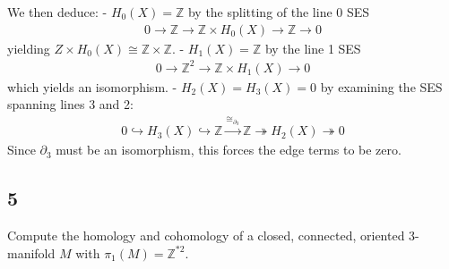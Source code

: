 \begin{solution}
We then deduce: - \(H_0(X) = {\mathbb{Z}}\) by the splitting of the line
0 SES
\begin{align*}
  0 \to {\mathbb{Z}}\to {\mathbb{Z}}\times H_0(X) \to {\mathbb{Z}}\to 0
  \end{align*}
yielding \(Z\times H_0(X) \cong {\mathbb{Z}}\times {\mathbb{Z}}\). -
\(H_1(X) = {\mathbb{Z}}\) by the line 1 SES
\begin{align*}
  0 \to {\mathbb{Z}}^2 \to {\mathbb{Z}}\times H_1(X) \to 0
  \end{align*}
which yields an isomorphism. - \(H_2(X) = H_3(X) = 0\) by examining the
SES spanning lines 3 and 2:
\begin{align*}
  0 \hookrightarrow H_3(X) \hookrightarrow{\mathbb{Z}}\xrightarrow{\cong_{{\partial}_3}} {\mathbb{Z}}\twoheadrightarrow H_2(X) \twoheadrightarrow 0
  \end{align*}
Since \({\partial}_3\) must be an isomorphism, this forces the edge
terms to be zero.

\end{solution}

\hypertarget{section-9}{%
\subsection{5}\label{section-9}}

Compute the homology and cohomology of a closed, connected, oriented
3-manifold \(M\) with \(\pi_1(M) = {\mathbb{Z}}^{\ast 2}\).

